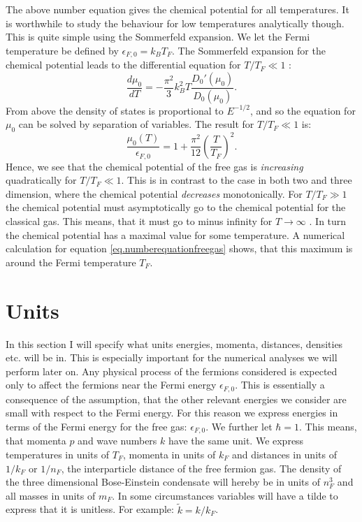 The above number equation gives the chemical potential for all temperatures. It is worthwhile to study the behaviour for low temperatures analytically though. This is quite simple using the Sommerfeld expansion. We let the Fermi temperature be defined by $\epsilon_{F,0} = k_B T_F$. The Sommerfeld expansion for the chemical potential leads to the differential equation for $T/T_F \ll 1$ \cite[pp. 115-116]{GiuseppeGiuseppe}:
\begin{equation}
\frac{d\mu_0}{dT} = -\frac{\pi^2}{3}k_B^2 T \frac{D_0'(\mu_0)}{D_0(\mu_0)}. \nonumber
\end{equation}
From above the density of states is proportional to $E^{-1/2}$, and so the equation for $\mu_0$ can be solved by separation of variables. The result for $T/T_F\ll 1$ is:
\begin{equation}
\frac{\mu_0(T)}{\epsilon_{F,0}} = 1 + \frac{\pi^2}{12}\left(\frac{T}{T_F}\right)^2. 
\label{eq.Sommerfeldexpansionchemicalpotential}
\end{equation}
Hence, we see that the chemical potential of the free gas is \textit{increasing} quadratically for $T/T_F \ll 1$. This is in contrast to the case in both two and three dimension, where the chemical potential \textit{decreases} monotonically. For $T/T_F \gg 1$ the chemical potential must asymptotically go to the chemical potential for the classical gas. This means, that it must go to minus infinity for $T\to \infty$ \cite[pp. 117-118]{SchroederThermal}. In turn the chemical potential has a maximal value for some temperature. A numerical calculation for equation \eqref{eq.numberequationfreegas} shows, that this maximum is around the Fermi temperature $T_F$. 

\section{Units}
In this section I will specify what units energies, momenta, distances, densities etc. will be in. This is especially important for the numerical analyses we will perform later on. Any physical process of the fermions considered is expected only to affect the fermions near the Fermi energy $\epsilon_{F,0}$. This is essentially a consequence of the assumption, that the other relevant energies we consider are small with respect to the Fermi energy. For this reason we express energies in terms of the Fermi energy for the free gas: $\epsilon_{F,0}$. We further let $\hbar = 1$. This means, that momenta $p$ and wave numbers $k$ have the same unit. We express temperatures in units of $T_F$, momenta in units of $k_F$ and distances in units of $1/k_F$ or $1/n_F$, the interparticle distance of the free fermion gas. The density of the three dimensional Bose-Einstein condensate will hereby be in units of $n_F^3$ and all masses in units of $m_F$. In some circumstances variables will have a tilde to express that it is unitless. For example: $\tilde{k} = k/k_F$.

